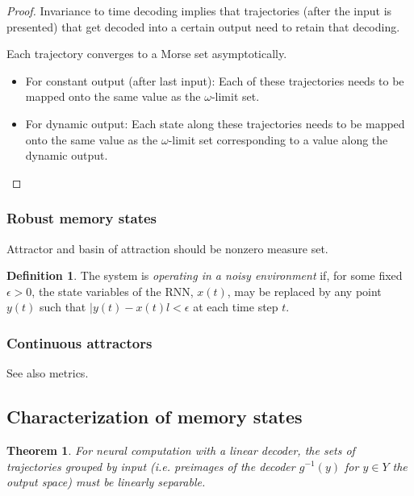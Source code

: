 \documentclass{scrartcl}
\newtheorem{theorem}{Theorem}
\theoremstyle{definition}
\newtheorem{definition}{Definition}
\theoremstyle{remark}
\begin{document}
\begin{proof}
Invariance to time decoding implies that trajectories (after the input is presented) that get decoded into a certain output need to retain that decoding.

Each trajectory converges to a Morse set asymptotically.

\begin{itemize}
\item For constant output (after last input): Each of these trajectories needs to be mapped onto the same value as the $\omega$-limit set.
\item For dynamic output: Each state along these trajectories needs to be mapped onto the same value as the $\omega$-limit set corresponding to a value along the dynamic output. %
\end{itemize}
\end{proof}


\subsubsection{Robust memory states}
Attractor and basin of attraction should be nonzero measure set.

\begin{definition}
The system is \emph{operating in a noisy environment} if, for some fixed $\epsilon > 0$, the state variables of the RNN, $x(t)$, may be replaced by any point $y(t)$ such that $|y(t) - x(t)l < \epsilon$ at each time step $t$.
\end{definition}

\subsubsection{Continuous attractors}%
See also metrics.


\subsection{Characterization of memory states}

\begin{theorem}
For neural computation with a linear decoder, the sets of trajectories grouped by input (i.e. preimages of the decoder $g^{-1}(y)$ for $y\in Y$ the output space) must be linearly separable.
\end{theorem}
\end{document}
